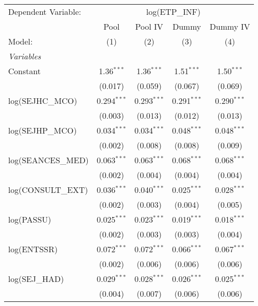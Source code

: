 
\begingroup
\centering
\begin{tabular}{lcccc}
   \tabularnewline \midrule \midrule
   Dependent Variable: & \multicolumn{4}{c}{log(ETP\_INF)}\\
                      & Pool          & Pool IV       & Dummy          & Dummy IV \\   
   Model:             & (1)           & (2)           & (3)            & (4)\\  
   \midrule
   \emph{Variables}\\
   Constant           & 1.36$^{***}$  & 1.36$^{***}$  & 1.51$^{***}$   & 1.50$^{***}$\\   
                      & (0.017)       & (0.059)       & (0.067)        & (0.069)\\   
   log(SEJHC\_MCO)    & 0.294$^{***}$ & 0.293$^{***}$ & 0.291$^{***}$  & 0.290$^{***}$\\   
                      & (0.003)       & (0.013)       & (0.012)        & (0.013)\\   
   log(SEJHP\_MCO)    & 0.034$^{***}$ & 0.034$^{***}$ & 0.048$^{***}$  & 0.048$^{***}$\\   
                      & (0.002)       & (0.008)       & (0.008)        & (0.009)\\   
   log(SEANCES\_MED)  & 0.063$^{***}$ & 0.063$^{***}$ & 0.068$^{***}$  & 0.068$^{***}$\\   
                      & (0.002)       & (0.004)       & (0.004)        & (0.004)\\   
   log(CONSULT\_EXT)  & 0.036$^{***}$ & 0.040$^{***}$ & 0.025$^{***}$  & 0.028$^{***}$\\   
                      & (0.002)       & (0.003)       & (0.004)        & (0.005)\\   
   log(PASSU)         & 0.025$^{***}$ & 0.023$^{***}$ & 0.019$^{***}$  & 0.018$^{***}$\\   
                      & (0.002)       & (0.003)       & (0.003)        & (0.004)\\   
   log(ENTSSR)        & 0.072$^{***}$ & 0.072$^{***}$ & 0.066$^{***}$  & 0.067$^{***}$\\   
                      & (0.002)       & (0.006)       & (0.006)        & (0.006)\\   
   log(SEJ\_HAD)      & 0.029$^{***}$ & 0.028$^{***}$ & 0.026$^{***}$  & 0.025$^{***}$\\   
                      & (0.004)       & (0.007)       & (0.006)        & (0.006)\\   

\end{tabular}
